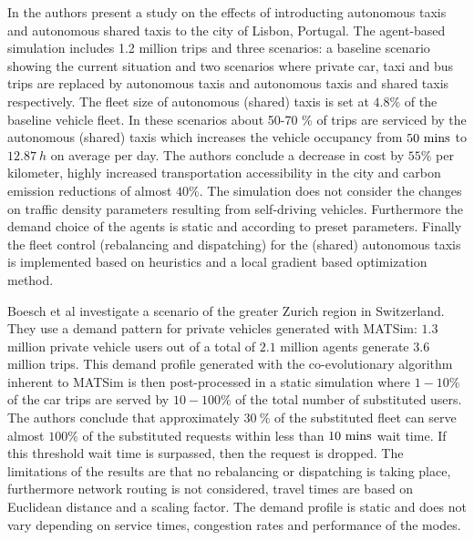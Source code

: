 In \cite{martinez2017assessing} the authors present a study on the effects of
introducting autonomous taxis and autonomous shared taxis to the city of Lisbon,
Portugal. The agent-based simulation includes 1.2 million trips and three scenarios:
a baseline scenario showing the current situation and two scenarios where private car,
taxi and bus trips are replaced by autonomous taxis and autonomous taxis and shared
taxis respectively. The fleet size of autonomous (shared) taxis is set at $4.8\%$ of
the baseline vehicle fleet. In these scenarios about 50-70 \% of trips are serviced
by the autonomous (shared) taxis which increases the vehicle occupancy
from $50 ~ \textnormal{mins}$ to $12.87 ~ h$ on average per day. The authors conclude
a decrease in cost by $55 \%$ per kilometer, highly increased transportation
accessibility in the city and carbon emission reductions of almost $40\%$. The
simulation does not consider the changes on traffic density parameters resulting
from self-driving vehicles. Furthermore the demand choice of the agents is static
and according to preset parameters. Finally the fleet control (rebalancing and dispatching)
for the (shared) autonomous taxis is implemented based on heuristics and a local
gradient based optimization method.

Boesch et al \cite{boesch2016autonomous} investigate a scenario of the greater
Zurich region in Switzerland. They use a demand pattern for private vehicles
generated with MATSim: $1.3$ million  private vehicle users out of a total of
$2.1$ million agents generate $3.6$ million trips. This demand profile generated
with the co-evolutionary algorithm inherent to MATSim is then post-processed
in a static simulation where $1-10 \%$ of the car trips are served by $10-100 \%$
of the total number of substituted users. The authors conclude that approximately
$30 ~ \%$ of the substituted fleet can serve almost $100 \%$ of the substituted
requests within less than $10 ~ \textnormal{mins}$ wait time. If this threshold
wait time is surpassed, then the request is dropped. The limitations of the results
are that no rebalancing or dispatching is taking place, furthermore network routing
 is not considered, travel times are based on Euclidean distance and a scaling factor.
  The demand profile is static and does not vary depending on service times,
  congestion rates and performance of the modes.

